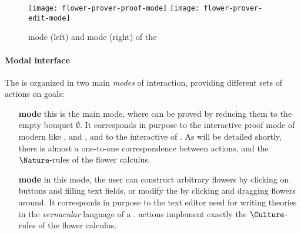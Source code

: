 \begin{scope}
\begin{figure*}
  \texttt{[image: flower-prover-proof-mode]}
  \hspace{1em}
  \texttt{[image: flower-prover-edit-mode]}
  \caption{\Proof mode (left) and \Edit mode (right) of the }
\end{figure*}

\paragraph{Modal interface}

The  is organized in two main \emph{modes} of interaction,
providing different sets of  actions on
goals:
\begin{itemize}
  \item[\textbf{\Proof mode}] this is the main mode, where  can be proved by
  reducing them to the empty bouquet $\emptyset$. It corresponds in purpose to
  the interactive proof mode of modern  like ,  and
  , and to the interactive  of .
  As will be detailed shortly, there is almost a one-to-one correspondence
  between \Proof actions, and the $\Nature$-rules of the flower calculus.
  
  \item[\textbf{\Edit mode}] in this mode, the user can construct arbitrary
  flowers by clicking on buttons and filling text fields, or modify the  by
  clicking and dragging flowers around. It corresponds in purpose to the text
  editor used for writing theories in the \emph{vernacular} language of a . \Edit actions implement exactly the
  $\Culture$-rules of the flower calculus.
\end{itemize}


\end{scope}
